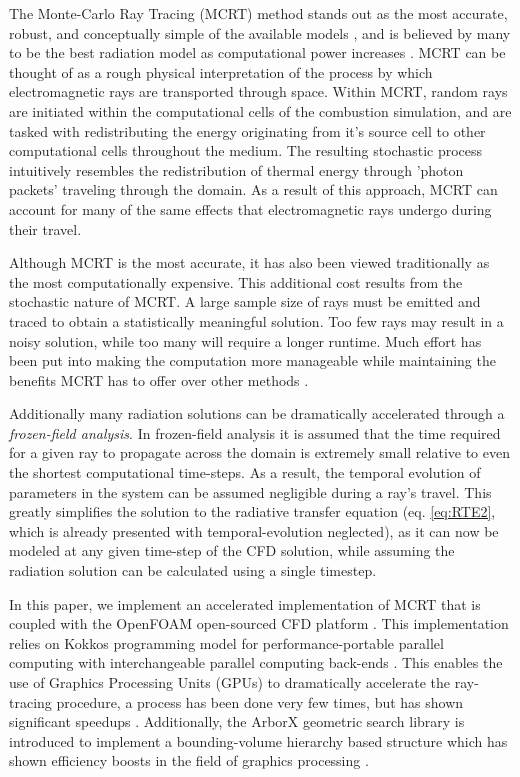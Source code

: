 The Monte-Carlo Ray Tracing (MCRT) method stands out as the most accurate, robust, and conceptually simple of the available models \cite{Tesse2002RadiativeApproach,Modest2013RadiativeTransfer,Coelho2018RadiativeSystems}, and is believed by many to be the best radiation model as computational power increases \cite{Howell2010ThermalTransfer}.
MCRT can be thought of as a rough physical interpretation of the process by which electromagnetic rays are transported through space.
Within MCRT, random rays are initiated within the computational cells of the combustion simulation, and are tasked with redistributing the energy originating from it's source cell to other computational cells throughout the medium. The resulting stochastic process intuitively resembles the redistribution of thermal energy through 'photon packets' traveling through the domain.
As a result of this approach, MCRT can account for many of the same effects that electromagnetic rays undergo during their travel.

Although MCRT is the most accurate, it has also been viewed traditionally as the most computationally expensive.
This additional cost results from the stochastic nature of MCRT. A large sample size of rays must be emitted and traced to obtain a statistically meaningful solution. 
Too few rays may result in a noisy solution, while too many will require a longer runtime.
Much effort has been put into making the computation more manageable while maintaining the benefits MCRT has to offer over other methods \cite{Liu2020TheFlames,Tesse2002RadiativeApproach,Zeeb2001AnGeometries,Modest2003BackwardTransfer,Howell2010ThermalTransfer}.

Additionally many radiation solutions can be dramatically accelerated through a \textit{frozen-field analysis}. In frozen-field analysis it is assumed that the time required for a given ray to propagate across the domain is extremely small relative to even the shortest computational time-steps. 
As a result, the temporal evolution of parameters in the system can be assumed negligible during a ray's travel.
This greatly simplifies the solution to the radiative transfer equation (eq. \ref{eq:RTE2}, which is already presented with temporal-evolution neglected), as it can now be modeled at any given time-step of the CFD solution, while assuming the radiation solution can be calculated using a single timestep.

In this paper, we implement an accelerated implementation of MCRT that is coupled with the OpenFOAM open-sourced CFD platform \cite{Weller1998ATechniques}. 
This implementation relies on Kokkos programming model for performance-portable parallel computing with interchangeable parallel computing back-ends \cite{Trott2021KokkosEra}. This enables the use of Graphics Processing Units (GPUs) to dramatically accelerate the ray-tracing procedure, a process has been done very few times, but has shown significant speedups \cite{Silvestri2019ASimulation,Humphrey2016RadiativeRefinement,Heymann2012GPU-basedAGN}. 
Additionally, the ArborX geometric search library is introduced to implement a bounding-volume hierarchy based structure which has shown efficiency boosts in the field of graphics processing \cite{Lebrun-Grandie2019ArborX:Library}. 

